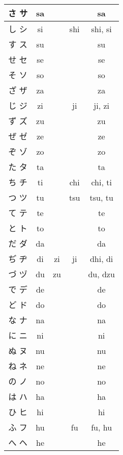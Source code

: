 \documentclass{article}
\begin{document}
\begin{center}
\begin{japanese}
\begin{longtable}{|c|c c c|c|}
                さ サ & sa &&& sa \\ \hline
                し シ & si && \multicolumn{1}{|c|}{shi} & shi, si \\ \hline
                す ス & su &&& su \\ \hline
                せ セ & se &&& se \\ \hline
                そ ソ & so &&& so \\ \hline
                ざ ザ & za &&& za \\ \hline
                じ ジ & zi && \multicolumn{1}{|c|}{ji} & ji, zi \\ \hline
                ず ズ & zu &&& zu \\ \hline
                ぜ ゼ & ze &&& ze \\ \hline
                ぞ ゾ & zo &&& zo \\ \hline
                た タ & ta &&& ta \\ \hline
                ち チ & ti && \multicolumn{1}{|c|}{chi} & chi, ti \\ \hline
                つ ツ & tu && \multicolumn{1}{|c|}{tsu} & tsu, tu \\ \hline
                て テ & te &&& te \\ \hline
                と ト & to &&& to \\ \hline
                だ ダ & da &&& da \\ \hline
                ぢ ヂ & di & \multicolumn{1}{|c|}{zi} & \multicolumn{1}{|c|}{ji} & dhi, di \\ \hline
                づ ヅ & du & \multicolumn{1}{|c}{zu} && du, dzu \\ \hline
                で デ & de &&& de \\ \hline
                ど ド & do &&& do \\ \hline
                な ナ & na &&& na \\ \hline
                に ニ & ni &&& ni \\ \hline
                ぬ ヌ & nu &&& nu \\ \hline
                ね ネ & ne &&& ne \\ \hline
                の ノ & no &&& no \\ \hline
                は ハ & ha &&& ha \\ \hline
                ひ ヒ & hi &&& hi \\ \hline
                ふ フ & hu && \multicolumn{1}{|c|}{fu} & fu, hu \\ \hline
                へ ヘ & he &&& he \\ \hline

\end{longtable}
\end{japanese}
\end{center}
\end{document}
